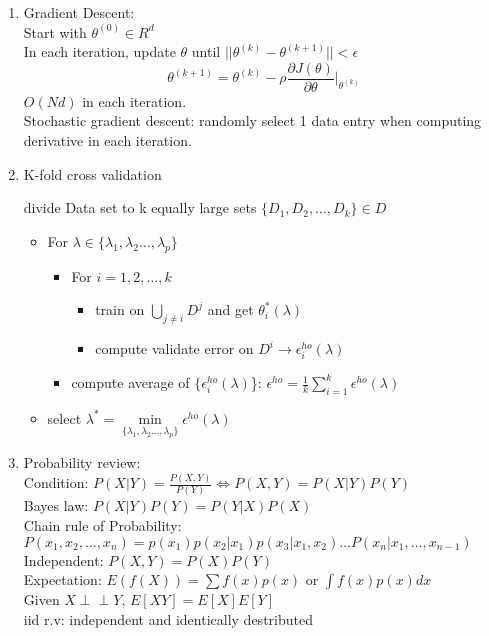 \documentclass[10pt]{article}
\newcommand{\indep}{\perp \!\!\! \perp}
\begin{document}
\begin{multicols}{2}
\begin{enumerate}
        \item Gradient Descent:\\
        Start with $\theta^{(0)} \in R^d$\\
        In each iteration, update $\theta$ until $||\theta^{(k)} - \theta^{(k+1)}|| < \epsilon$\\
        $$\theta^{(k+1)} = \theta^{(k)} - \rho\frac{\partial J(\theta)}{\partial \theta} |_{\theta^{(k)}}$$
        $O(Nd)$ in each iteration.\\
        Stochastic gradient descent: randomly select 1 data entry when computing derivative in each iteration.

        \item K-fold cross validation
            
        divide Data set to k equally large sets $\{D_1, D_2, \dots, D_k\} \in D$

        \begin{itemize}
            \item For $\lambda \in \{\lambda_1, \lambda_2 \dots, \lambda_p\}$
            \begin{itemize}
                \item For $i = 1,2, \dots, k$
                \begin{itemize}
                    \item train on $\bigcup\limits_{j\ne i}D^j$ and get $\theta_i^*(\lambda)$
                    \item compute validate error on $D^i \rightarrow \epsilon^{ho}_i(\lambda)$
                \end{itemize}
                \item compute average of $\{\epsilon_i^{ho}(\lambda)$\}: $\epsilon^{ho} = \frac{1}{k}\sum_{i = 1}^{k}\epsilon^{ho}(\lambda)$
            \end{itemize}
            \item select $\lambda^* = \min\limits_{\{\lambda_1, \lambda_2 \dots, \lambda_p\}}\epsilon^{ho}(\lambda)$
        \end{itemize}
        
        \item Probability review:\\
        Condition: $P(X|Y) = \frac{P(X, Y)}{P(Y)} \Leftrightarrow P(X,Y) = P(X|Y)P(Y)$\\
        Bayes law: $P(X|Y)P(Y) = P(Y|X)P(X)$\\
        Chain rule of Probability: $P(x_1, x_2, \dots, x_n) = p(x_1)p(x_2|x_1)p(x_3|x_1,x_2) \dots P(x_n | x_1, \dots, x_{n-1})$
        Independent: $P(X,Y) = P(X)P(Y)$\\
        Expectation: $E(f(X)) = \sum f(x)p(x)$ or $\int f(x)p(x)dx$\\
        Given $X\indep Y$, $E[XY] = E[X]E[Y] $ \\
        iid r.v: independent and identically destributed


\end{enumerate}
\end{multicols}
\end{document}
